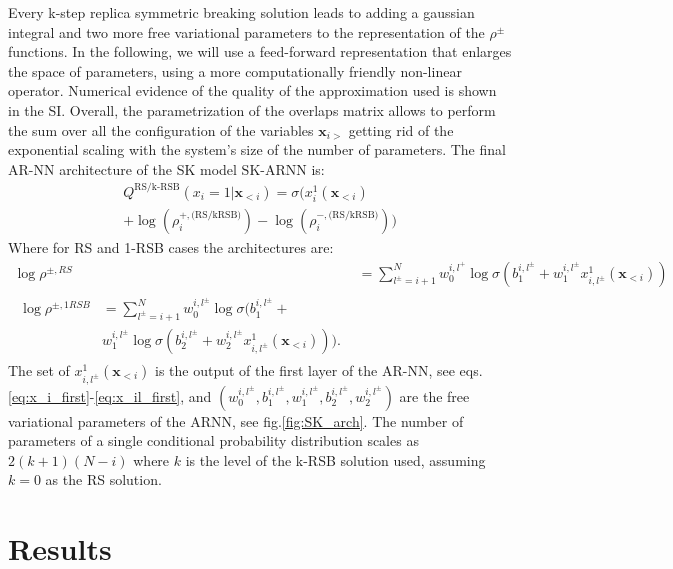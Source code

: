 \documentclass[aps,physrev,10pt,floatfix,reprint]{revtex4-2}
\begin{document}
Every k-step replica symmetric breaking solution leads to adding a gaussian integral and two more free variational parameters to the representation of the $\rho^{\pm}$ functions. 
In the following, we will use a feed-forward representation that enlarges the space of parameters, using a more computationally friendly non-linear operator. 
Numerical evidence of the quality of the approximation used is shown in the SI. 
Overall, the parametrization of the overlaps matrix allows to perform the sum over all the configuration of the variables $\mathbf{x}_{i>}$ getting rid of the exponential scaling with the system's size of the number of parameters. 
The final AR-NN architecture of the SK model $\text{SK-ARNN}$ is: 
\begin{multline}
    Q^{\text{RS/k-RSB}}\left(x_{i}=1|\mathbf{x}_{<i}\right) = \sigma\bigg( 
        x_i^1(\mathbf{x}_{<i}) \\
        +\log(\rho_i^{+, \text{(RS/kRSB)}}) -
         \log(\rho_i^{-, \text{(RS/kRSB)}})
    \bigg)  
\end{multline}
Where for RS and 1-RSB cases the architectures are:
\begin{align*}
    \log \rho^{\pm, RS} & = \sum_{l^{\pm}=i+1}^{N}  w_0^{i,l^+} \log \sigma(b_1^{i,l^{\pm}} +
w_1^{i,l^{\pm}} x_{i,l^{\pm}}^1(\mathbf{x}_{<i})) \\
\begin{split}
    \log \rho^{\pm, 1RSB} & = 
    \sum_{l^{\pm}=i+1}^{N}  w_0^{i,l^{\pm}} \log\sigma(b_1^{i,l^{\pm}} + \\
    &  w_1^{i,l^{\pm}} \log\sigma(b_2^{i,l^{\pm}} +  w_2^{i,l^{\pm}}  x_{i,l^{\pm}}^1(\mathbf{x}_{<i}))). 
    \end{split}
\end{align*}
The set of $x_{i,l^{\pm}}^1(\mathbf{x}_{<i})$ is the output of the first layer of the AR-NN, see eqs.\ref{eq:x_i_first}-\ref{eq:x_il_first}, and $(w_0^{i,l^{\pm}}, b_1^{i,l^{\pm}}, w_1^{i,l^{\pm}}, b_2^{i,l^{\pm}}, w_2^{i,l^{\pm}})$ are the free variational parameters of the ARNN, see fig.\ref{fig:SK_arch}. The number of parameters of a single conditional probability distribution scales as $2(k+1)(N-i)$ where $k$ is the level of the k-RSB solution used, assuming $k=0$ as the RS solution.

\section{Results}
\end{document}
